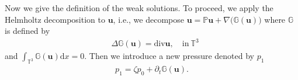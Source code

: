 \documentclass[reqno,a4paper,11pt]{amsart}
\theoremstyle{plain}
\numberwithin{equation}{section}
\renewcommand{\d}{\mathrm{d}}
\begin{document}
	
	
	
	
	
	
	Now we give the definition of the weak solutions. To proceed, we apply the Helmholtz decomposition to $\mathbf{u}$, i.e., we decompose $\mathbf{u}=\mathbb{P}\mathbf{u}+\nabla\big( \mathbb{G}(\mathbf{u})\big)$ where $\mathbb{G}$ is defined by
	\begin{align*}
		&\Delta \mathbb{G}(\mathbf{u})=\mathrm{div}\mathbf{u},\quad \text{in}\ \mathbb{T}^{3}
	\end{align*}
	and $\int_{\mathbb{T}^{3}} \mathbb{G}(\mathbf{u})  \d x=0$. Then we introduce a new pressure denoted by $p_{1}$
	\begin{align}
		p_{1}=\zeta p_{0}+\partial_{t}\mathbb{G}(\mathbf{u}).\label{new pressure-introduction}
	\end{align}
\end{document}
